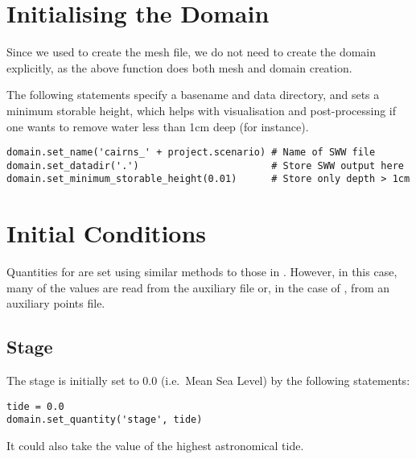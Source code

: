 \documentclass{manual}
\begin{document}
\section{Initialising the Domain}

Since we used  to create the mesh file, we do not need to
create the domain explicitly, as the above function does both mesh and domain creation.

The following statements specify a basename and data directory, and
sets a minimum storable height, which helps with visualisation and post-processing
if one wants to remove water less than 1cm deep (for instance).

\begin{verbatim}
domain.set_name('cairns_' + project.scenario) # Name of SWW file
domain.set_datadir('.')                       # Store SWW output here
domain.set_minimum_storable_height(0.01)      # Store only depth > 1cm
\end{verbatim}

\section{Initial Conditions}

Quantities for  are set
using similar methods to those in . However,
in this case, many of the values are read from the auxiliary file
 or, in the case of , from an
auxiliary points file.

\subsection{Stage}

The stage is initially set to 0.0 (i.e.\ Mean Sea Level) by the following statements:

\begin{verbatim}
tide = 0.0
domain.set_quantity('stage', tide)
\end{verbatim}

It could also take the value of the highest astronomical tide.

\end{document}

